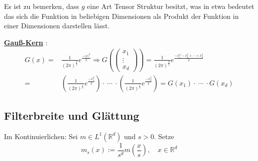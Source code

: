 \documentclass{article}
\theoremstyle{plain}
\theoremstyle{definition}
\numberwithin{equation}{section}
\newcommand{\abs}[1] {
\left| #1 \right|
}
\newcommand{\R}[0] {
\mathbb R
}
\newcommand{\srmatrix}[1] {
\left( \begin{smallmatrix} #1 \end{smallmatrix} \right)
}
\newcommand{\mim}[1] {
\underline{\textbf{#1\index{#1}}}
}
\newcommand{\x}[0] {
  \boldsymbol{x}
}
\begin{document}
    Es ist zu bemerken, dass $g$ eine Art Tensor Struktur besitzt, was in etwa bedeutet das sich die Funktion in beliebigen Dimensionen als Produkt der Funktion in einer Dimensionen darstellen lässt.

    \mim{Gauß-Kern}:
    \begin{align*}
        G(x) =& \frac{1}{(2 \pi)^{\frac{d}{2}}} e^{\frac{-\abs{x}^2}{2}} \Rightarrow G\left( \srmatrix{x_1\\\vdots\\x_d} \right) = \frac{1}{(2 \pi)^{\frac{d}{2}}} e^{\frac{-x_1^2-x_2^2 + \cdots + x_d^2}{2}}\\
        =& \left( \frac{1}{(2 \pi)^\frac{1}{2}} e^{\frac{-x_1^2}{2}}\right) \cdot \ \cdots \ \cdot \left( \frac{1}{(2 \pi)^\frac{1}{2}} e^{\frac{-x_d^2}{2}}\right) = G(x_1) \cdot \ \cdots \ \cdot G(x_d)
    \end{align*}

    \subsection{Filterbreite und Glättung}

    \begin{center}
    \end{center}

    Im Kontinuierlichen: Sei $m \in L^1(\R^d)$ und $s > 0$.
    Setze
        $$ m_s(x) := \frac{1}{s^d} m (\frac{x}{s}), \quad x\in \R^d$$
\end{document}

